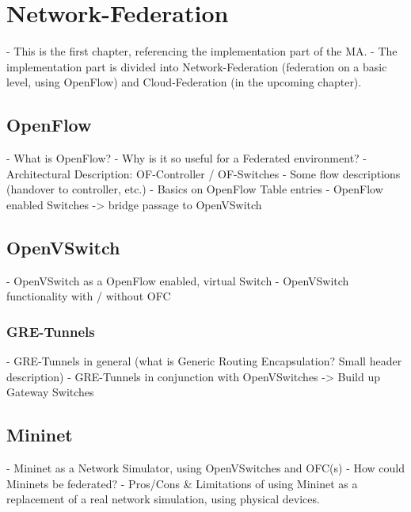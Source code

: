 \chapter{Network-Federation}
- This is the first chapter, referencing the implementation part of the MA.
- The implementation part is divided into Network-Federation (federation on a basic level, using OpenFlow) and Cloud-Federation (in the upcoming chapter).


\section{OpenFlow}
- What is OpenFlow?
- Why is it so useful for a Federated environment?
- Architectural Description: OF-Controller / OF-Switches
- Some flow descriptions (handover to controller, etc.)
- Basics on OpenFlow Table entries
- OpenFlow enabled Switches -> bridge passage to OpenVSwitch



\section{OpenVSwitch}
- OpenVSwitch as a OpenFlow enabled, virtual Switch
- OpenVSwitch functionality with / without OFC

\subsection{GRE-Tunnels}
- GRE-Tunnels in general (what is Generic Routing Encapsulation? Small header description)
- GRE-Tunnels in conjunction with OpenVSwitches -> Build up Gateway Switches



\section{Mininet}
- Mininet as a Network Simulator, using OpenVSwitches and OFC(s)
- How could Mininets be federated?
- Pros/Cons \& Limitations of using Mininet as a replacement of a real network simulation, using physical devices.